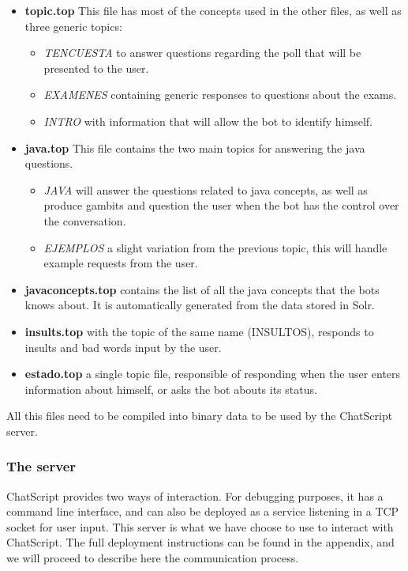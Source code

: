 \begin{itemize}
 \item \textbf{topic.top} This file has most of the concepts used in the other files, as well as three generic topics:
 \begin{itemize}
  \item \emph{TENCUESTA} to answer questions regarding the poll that will be presented to the user.
  \item \emph{EXAMENES} containing generic responses to questions about the exams.
  \item \emph{INTRO} with information that will allow the bot to identify himself.
 \end{itemize}
 \item \textbf{java.top} This file contains the two main topics for answering the java questions.
 \begin{itemize}
  \item \emph{JAVA} will answer the questions related to java concepts, as well as produce gambits and question the user when the bot has the control over the conversation.
  \item \emph{EJEMPLOS} a slight variation from the previous topic, this will handle example requests from the user.
 \end{itemize}
 \item \textbf{javaconcepts.top} contains the list of all the java concepts that the bots knows about. It is automatically generated from the data stored in Solr.
 \item \textbf{insults.top} with the topic of the same name (INSULTOS), responds to insults and bad words input by the user.
 \item \textbf{estado.top} a single topic file, responsible of responding when the user enters information about himself, or asks the bot abouts its status.
\end{itemize}

All this files need to be compiled into binary data to be used by the ChatScript server.

\subsubsection{The server}

ChatScript provides two ways of interaction. For debugging purposes, it has a command line interface, and can also be deployed as a service listening in a TCP socket for user input. This server is what we have choose to use to interact with ChatScript. The full deployment instructions can be found in the appendix, and we will proceed to describe here the communication process.

